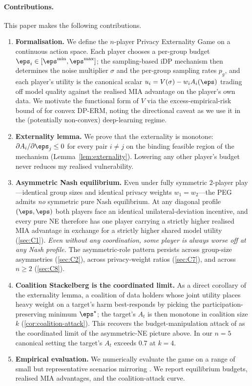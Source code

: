 \paragraph{Contributions.}
This paper makes the following contributions.
\begin{enumerate}
\item \textbf{Formalisation.} We define the $n$-player Privacy Externality
  Game on a continuous action space. Each player chooses a per-group budget
  $\eps_i \in [\eps^{\min}, \eps^{\max}]$; the sampling-based iDP mechanism
  then determines the noise multiplier $\sigma$ and the per-group sampling
  rates $p_g$, and each player's utility is the canonical scalar
  $u_i = V(\sigma) - w_i A_i(\boldsymbol{\eps})$ trading off model
  quality against the realised MIA advantage on the player's own data.
  We motivate the functional form of $V$ via the excess-empirical-risk bound
  of \citet{bassily2014private} for convex DP-ERM, noting the directional
  caveat as we use it in the (potentially non-convex) deep-learning regime.

\item \textbf{Externality lemma.} We prove that the externality is monotone:
  $\partial A_i / \partial \eps_j \leq 0$ for every pair $i \neq j$ on the
  binding feasible region of the mechanism (Lemma~\ref{lem:externality}).
  Lowering any other player's budget never reduces my realised vulnerability.

\item \textbf{Asymmetric Nash equilibrium.} Even under fully symmetric
  $2$-player play---identical group sizes and identical privacy
  weights $w_1 = w_2$---the PEG admits \emph{no} symmetric pure Nash
  equilibrium. At any diagonal profile $(\eps, \eps)$ both players
  face an identical unilateral-deviation incentive, and every pure NE
  therefore has one player carrying a strictly higher realised MIA
  advantage in exchange for a strictly higher shared model utility
  (\cref{sec:C1}). \emph{Even without any
  coordination, some player is always worse off at any Nash profile.}
  The asymmetric-role pattern persists across group-size asymmetries
  (\cref{sec:C2}), across privacy-weight ratios
  (\cref{sec:C7}), and across $n \geq 2$
  (\cref{sec:C8}).

\item \textbf{Coalition Stackelberg is the coordinated limit.} As a
  direct corollary of the externality lemma, a coalition of data
  holders whose joint utility places heavy weight on a target's harm
  best-responds by picking the participation-preserving minimum
  $\eps^{\star}$; the target's $A_t$ is then monotone in coalition
  size $k$ (\cref{cor:coalition-attack}). This recovers the
  budget-manipulation attack of \citet{kaiser2026your} as the
  coordinated limit of the asymmetric-NE picture above. In our $n=5$
  canonical setting the target's $A_t$ exceeds $0.7$ at $k=4$.

\item \textbf{Empirical evaluation.} We numerically evaluate the game on a
  range of small but representative scenarios mirroring
  \cite{kaiser2026your}. We report equilibrium budgets, realised MIA
  advantages, and the coalition-attack curve.
\end{enumerate}

